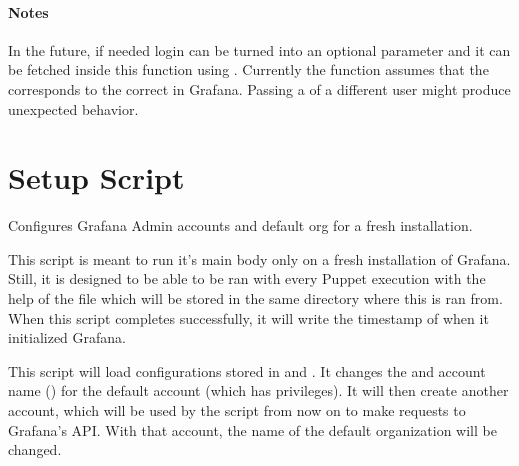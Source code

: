 \documentclass[letterpaper,10pt,english]{sphinxmanual}
\begin{document}
\begin{fulllineitems}
\begin{quote}
\begin{description}
\begin{description}
\end{description}

\end{description}\end{quote}






\subsubsection*{Notes}

In the future, if needed login can be turned into an optional parameter and it
can be fetched inside this function using . Currently the function
assumes that the  corresponds to the correct  in Grafana.
Passing a  of a different user might produce unexpected behavior.

\end{fulllineitems}



\chapter{Setup Script}
\label{\detokenize{setup:module-gpSetup}}\label{\detokenize{setup:setup-script}}\label{\detokenize{setup::doc}}
Configures Grafana Admin accounts and default org for a fresh installation.

This script is meant to run it’s main body only on a fresh installation of
Grafana. Still, it is designed to be able to be ran with every Puppet execution
with the help of the file  which will be stored in
the same directory where this is ran from. When this script completes
successfully, it will write the timestamp of when it initialized Grafana.

This script will load configurations stored in  and 
. It changes the  and account name
() for the default account (which has  privileges).
It will then create another account, which will be used by the script from now
on to make requests to Grafana’s API. With that account, the name of the
default organization will be changed.
\end{document}

